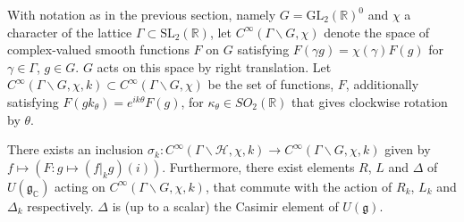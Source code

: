 With notation as in the previous section, namely $G=\text{GL}_2(\mathbb R)^0$ and $\chi$ a character of the lattice $\Gamma\subset \text{SL}_2(\mathbb R)$, let $C^{\infty}(\Gamma \backslash G, \chi)$ denote the space of complex-valued smooth functions $F$ on $G$ satisfying $F(\gamma g) = \chi (\gamma) F(g)$ for $\gamma \in \Gamma$, $g \in G$. $G$ acts on this space by right translation. Let $C^{\infty}(\Gamma \backslash G, \chi, k) \subset C^{\infty}(\Gamma \backslash G, \chi)$ be the set of functions, $F$, additionally satisfying $F(gk_\theta) = e^{ik\theta} F(g)$, for $\kappa_\theta \in SO_2(\mathbb{R})$ that gives clockwise rotation by $\theta$.


\begin{proposition}
	\label{proposition-functions-on-upper-half-plane-to-group-quotient}
	There exists an inclusion $\sigma_{k}: C^{\infty}(\Gamma \backslash \mathcal{H}, \chi, k) \to C^{\infty}(\Gamma \backslash G, \chi, k)$ given by $f \mapsto (F: g \mapsto (f|_k g)(i))$. Furthermore, there exist elements $R$, $L$ and $\Delta$ of $U(\mathfrak{g}_\mathbb{C})$ acting on $C^{\infty}(\Gamma \backslash G, \chi, k)$, that commute with the action of $R_k$, $L_k$ and $\Delta_k$ respectively. $\Delta$ is (up to a scalar) the Casimir element of $U(\mathfrak{g})$.
\end{proposition}

